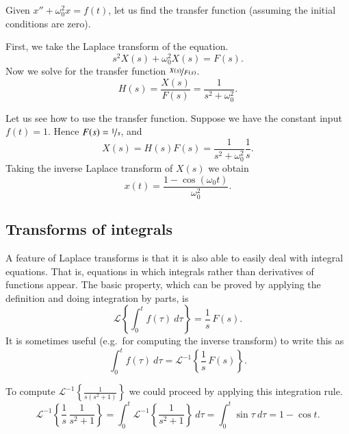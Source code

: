 \begin{example}
Given $x'' + \omega_0^2 x = f(t)$, let us find the transfer function
(assuming the initial conditions are zero).

First, we take the Laplace transform of the equation.
\begin{equation*}
s^2 X(s) + \omega_0^2 X(s) = F(s) .
\end{equation*}
Now we solve for the transfer function $\nicefrac{X(s)}{F(s)}$.
\begin{equation*}
H(s) = \frac{X(s)}{F(s)} = \frac{1}{s^2 + \omega_0^2} .
\end{equation*}

Let us see how to use the transfer function.  Suppose we have the constant input
$f(t) = 1$.  Hence $F(s) = \nicefrac{1}{s}$, and
\begin{equation*}
X(s) = H(s) F(s) = \frac{1}{s^2+\omega_0^2} \frac{1}{s} .
\end{equation*}
Taking the inverse Laplace transform of $X(s)$ we obtain
\begin{equation*}
x(t) = \frac{1-\cos(\omega_0 t)}{\omega_0^2} .
\end{equation*}
\end{example}

\subsection{Transforms of integrals}

A feature of Laplace transforms is that it is also able to easily deal
with integral equations.  That is, equations in which integrals rather than
derivatives of functions appear.  The basic property, which can be proved
by applying the definition and doing integration by parts, is 
\begin{equation*}
\boxed{~~
\mathcal{L} \left\{
\int_0^t f(\tau) ~ d\tau
\right\} = \frac{1}{s} \, F(s) .
~~}
\end{equation*}
It is sometimes useful (e.g.\ for computing the inverse transform) to write
this as
\begin{equation*}
\int_0^t f(\tau) ~ d\tau
=
{\mathcal{L}}^{-1} \left\{
\frac{1}{s} \, F(s) \right\} .
\end{equation*}

\begin{example}
To compute ${\mathcal{L}}^{-1} \left\{\frac{1}{s(s^2+1)}\right\}$ we could
proceed by applying this integration rule.  
\begin{equation*}
{\mathcal{L}}^{-1} \left\{
\frac{1}{s} \, \frac{1}{s^2+1} \right\} 
=
\int_0^t 
{\mathcal{L}}^{-1} \left\{
\frac{1}{s^2+1} \right\} ~ d\tau
=
\int_0^t 
\sin \tau ~ d\tau
=
1 - \cos t .
\end{equation*}
\end{example}

